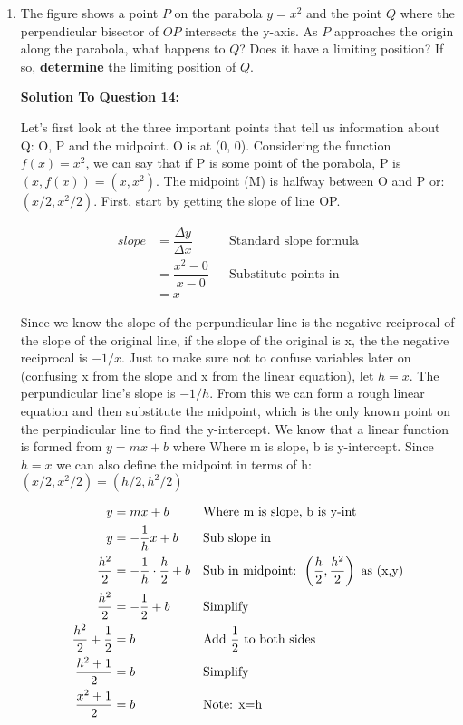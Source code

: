 \documentclass[12pt]{book}
\begin{document}
\begin{enumerate}
\newpage


\item The figure shows a point $P$ on the parabola $y=x^2$ and the point $Q$ where the perpendicular bisector of $OP$ intersects the y-axis. As $P$ approaches the origin along the parabola, what happens to $Q$? Does it have a limiting position? If so, \textbf{determine} the limiting position of $Q$. 

\vspace{0.3cm} 
\textbf{Solution To Question 14:}

Let's first look at the three important points that tell us information 
about Q: O, P and the midpoint. O is at (0, 0). Considering the 
function $f(x) = x^2$, we can say that if P is some point of the porabola, 
P is $(x, f(x)) = (x, x^2)$. The midpoint (M) is halfway between O and P or: 
$( x / 2, x^2 / 2 )$. First, start by getting the slope of line OP.

\addtolength{\jot}{-0.3em}
\begin{align*}
   slope &= \dfrac{\Delta y}{\Delta x} && \text{Standard slope formula} \\
   &= \dfrac{x^2-0}{x-0} && \text{Substitute points in} \\
   &= x
\end{align*}

\vspace{-0.3cm}

Since we know the slope of the perpundicular line is the negative reciprocal 
of the slope of the original line, if the slope of the original is x, the 
the negative reciprocal is $-1/x$. Just to make sure not to confuse variables 
later on (confusing x from the slope and x from the linear equation), let $h = x$. 
The perpundicular line's slope is $-1/h$. From this we can 
form a rough linear equation and then substitute the midpoint, which is the only 
known point on the perpindicular line to find the y-intercept. We know that a linear 
function is formed from $y=mx+b$ where Where m is slope, b is y-intercept. Since $h = x$
we can also define the midpoint in terms of h: $( x / 2, x^2 / 2 ) = ( h / 2, h^2 / 2 )$

\addtolength{\jot}{-0.2em}
\begin{align*}
   y &= mx+b && \text{Where m is slope, b is y-int} \\
   y &= - \dfrac{1}{h} x + b && \text{Sub slope in} \\
   \dfrac{h^2}{2} &= - \dfrac{1}{h} \cdot \dfrac{h}{2} + b && \text{Sub in midpoint: } \left( \dfrac{h}{2}, \dfrac{h^2}{2} \right) \text{\space as (x,y)} \\
   \dfrac{h^2}{2} &= - \dfrac{1}{2} + b && \text{Simplify} \\
   \dfrac{h^2}{2} + \dfrac{1}{2} &= b && \text{Add } \dfrac{1}{2} \text{ to both sides} \\
   \dfrac{h^2 + 1}{2} &= b && \text{Simplify} \\
   \dfrac{x^2 + 1}{2} &= b && \text{Note: x=h} \\
\end{align*}


\end{enumerate}
\end{document}
